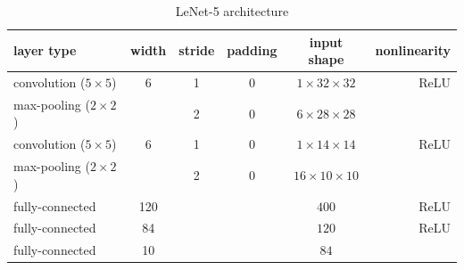 \documentclass[11pt]{article}
\theoremstyle{t}
\begin{document}
\begin{table}[h]
\begin{center}
    \label{table:lenet}
\begin{tabular}{ l c c c c r}
  \hline
  layer type & width & stride& padding & input shape& nonlinearity \\
  \hline
convolution ($5 \times 5$) & 6 & 1 & 0 & $1 \times 32 \times 32$ & ReLU \\
max-pooling ($2 \times 2$) &  & 2 & 0 & $6 \times 28 \times 28$ & \\
convolution ($5 \times 5$) & 6 & 1 & 0 & $1 \times 14 \times 14$ & ReLU \\
max-pooling ($2 \times 2$) &  & 2 & 0 & $16 \times 10 \times 10$ & \\
fully-connected & 120 &  &  & $400$ & ReLU \\
fully-connected & 84 &  &  & $ 120$ & ReLU \\
fully-connected & 10 &  &  & $ 84$ &  \\
  \hline
\end{tabular}
    \caption{LeNet-5 architecture}
\end{center}
\end{table}






\end{document}
